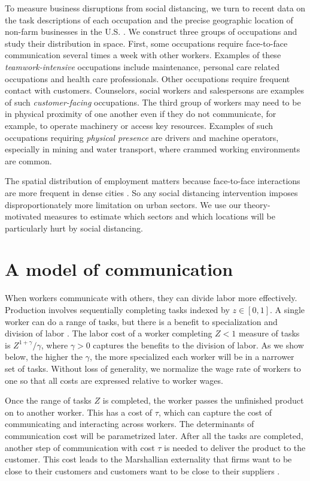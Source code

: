 To measure business disruptions from social distancing, we turn to recent data on the task descriptions of each occupation \cite{National_Center_for_ONET_Development2020-wj} and the precise geographic location of non-farm businesses in the U.S. \cite{CBP}. We construct three groups of occupations and study their distribution in space. First, some occupations require face-to-face communication several times a week with other workers. Examples of these \emph{teamwork-intensive} occupations include maintenance, personal care related occupations and health care professionals. Other occupations require frequent contact with customers. Counselors, social workers and salespersons are examples of such \emph{customer-facing} occupations. The third group of workers may need to be in physical proximity of one another even if they do not communicate, for example, to operate machinery or access key resources. Examples of such occupations requiring \emph{physical presence} are drivers and machine operators, especially in mining and water transport, where crammed working environments are common.

The spatial distribution of employment matters because face-to-face interactions are more frequent in dense cities \cite{Charlot2004-zr,Tian2019-wq}. So any social distancing intervention imposes disproportionately more limitation on urban sectors. We use our theory-motivated measures to estimate which sectors and which locations will be particularly hurt by social distancing.

\section*{A model of communication}
When workers communicate with others, they can divide labor more effectively. Production involves sequentially completing tasks indexed by $z\in[0,1]$. A single worker can do a range of tasks, but there is a benefit to specialization and division of labor \cite{Smith1778-qq,Becker1992-ac}. The labor cost of a worker completing $Z<1$ measure of tasks is $Z^{1+\gamma}/\gamma$, where $\gamma>0$ captures the benefits to the division of labor. As we show below, the higher the $\gamma$, the more specialized each worker will be in a narrower set of tasks. Without loss of generality, we normalize the wage rate of workers to one so that all costs are expressed relative to worker wages.

Once the range of tasks $Z$ is completed, the worker passes the unfinished product on to another worker. This has a cost of $\tau$, which can capture the cost of communicating and interacting across workers. The determinants of communication cost will be parametrized later. After all the tasks are completed, another step of communication with cost $\tau$ is needed to deliver the product to the customer. This cost leads to the Marshallian externality that firms want to be close to their customers and customers want to be close to their suppliers \cite{Marshall1920-ps,Krugman1991-gr}.

